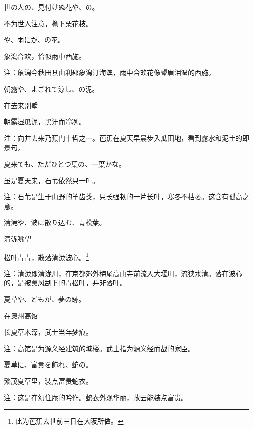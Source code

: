 \begin{haiku}
    {\FH 世の人の、見付けぬ花や、の。}

    {\FK 不为世人注意，檐下栗花枝。}
\end{haiku}

\begin{haiku}
    {\FH {}や、雨にが、の花。}

    {\FK 象潟合欢，恰似雨中西施。}

    {\FT 注：象潟今秋田县由利郡象潟汀海滨，雨中合欢花像颦眉泪湿的西施。}
\end{haiku}

\begin{haiku}
    {\FH 朝露や、よごれて涼し、の泥。}

    {\FK 在去来别墅}

    {\FK 朝露湿瓜泥，黑汙而冷冽。}

    {\FT 注：向井去来乃蕉门十哲之一。芭蕉在夏天早晨步入瓜田地，看到露水和泥土的即景句。}
\end{haiku}

\begin{haiku}
    {\FH 夏来ても、ただひとつ葉の、一葉かな。}

    {\FK 虽是夏天来，石苇依然只一叶。}

    {\FT 注：石苇是生于山野的羊齿类，只长强韧的一片长叶，寒冬不枯萎。这含有孤高之意。}
\end{haiku}

\begin{haiku}
    {\FH 清滝や、波に散り込む、青松葉。}

    {\FK 清泷眺望}

    {\FK 松叶青青，散落清泷波心。\footnote{\FT 此为芭蕉去世前三日在大阪所做。}}

    {\FT 注：清泷即清泷川，在京都郊外梅尾高山寺前流入大堰川，流狭水清。落在波心的，是被薰风刮下的青松叶，并非落叶。}
\end{haiku}

\begin{haiku}
    {\FH 夏草や、どもが、夢の跡。}

    {\FK 在奥州高馆}

    {\FK 长夏草木深，武士当年梦痕。}

    {\FT 注：高馆是为源义经建筑的城楼。武士指为源义经而战的家臣。}
\end{haiku}

\begin{haiku}
    {\FH 夏草に、富貴を飾れ、蛇の。}

    {\FK 繁茂夏草里，装点富贵蛇衣。}

    {\FT 注：这是在幻住庵的吟作。蛇衣外观华丽，故云能装点富贵。}
\end{haiku}

